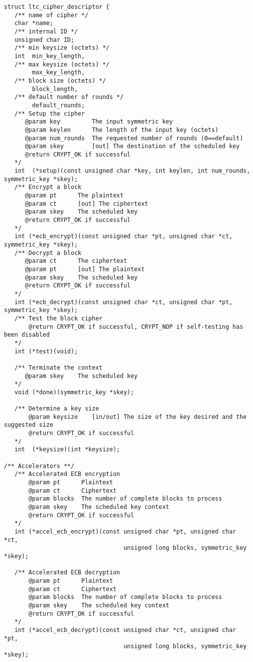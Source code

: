 \documentclass[a4paper]{book}
\begin{document}
\begin{small}
\begin{verbatim}
struct ltc_cipher_descriptor {
   /** name of cipher */
   char *name;
   /** internal ID */
   unsigned char ID;
   /** min keysize (octets) */
   int  min_key_length, 
   /** max keysize (octets) */
        max_key_length, 
   /** block size (octets) */
        block_length, 
   /** default number of rounds */
        default_rounds;
   /** Setup the cipher 
      @param key         The input symmetric key
      @param keylen      The length of the input key (octets)
      @param num_rounds  The requested number of rounds (0==default)
      @param skey        [out] The destination of the scheduled key
      @return CRYPT_OK if successful
   */
   int  (*setup)(const unsigned char *key, int keylen, int num_rounds, symmetric_key *skey);
   /** Encrypt a block
      @param pt      The plaintext
      @param ct      [out] The ciphertext
      @param skey    The scheduled key
      @return CRYPT_OK if successful
   */
   int (*ecb_encrypt)(const unsigned char *pt, unsigned char *ct, symmetric_key *skey);
   /** Decrypt a block
      @param ct      The ciphertext
      @param pt      [out] The plaintext
      @param skey    The scheduled key
      @return CRYPT_OK if successful
   */
   int (*ecb_decrypt)(const unsigned char *ct, unsigned char *pt, symmetric_key *skey);
   /** Test the block cipher
       @return CRYPT_OK if successful, CRYPT_NOP if self-testing has been disabled
   */
   int (*test)(void);

   /** Terminate the context 
      @param skey    The scheduled key
   */
   void (*done)(symmetric_key *skey);      

   /** Determine a key size
       @param keysize    [in/out] The size of the key desired and the suggested size
       @return CRYPT_OK if successful
   */
   int  (*keysize)(int *keysize);

/** Accelerators **/
   /** Accelerated ECB encryption 
       @param pt      Plaintext
       @param ct      Ciphertext
       @param blocks  The number of complete blocks to process
       @param skey    The scheduled key context
       @return CRYPT_OK if successful
   */
   int (*accel_ecb_encrypt)(const unsigned char *pt, unsigned char *ct, 
                                  unsigned long blocks, symmetric_key *skey);

   /** Accelerated ECB decryption 
       @param pt      Plaintext
       @param ct      Ciphertext
       @param blocks  The number of complete blocks to process
       @param skey    The scheduled key context
       @return CRYPT_OK if successful
   */
   int (*accel_ecb_decrypt)(const unsigned char *ct, unsigned char *pt, 
                                  unsigned long blocks, symmetric_key *skey);


\end{verbatim}
\end{small}
\end{document}
